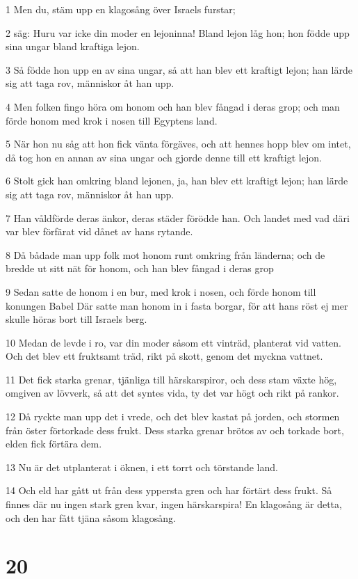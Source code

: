 \par 1 Men du, stäm upp en klagosång över Israels furstar;
\par 2 säg: Huru var icke din moder en lejoninna! Bland lejon låg hon; hon födde upp sina ungar bland kraftiga lejon.
\par 3 Så födde hon upp en av sina ungar, så att han blev ett kraftigt lejon; han lärde sig att taga rov, människor åt han upp.
\par 4 Men folken fingo höra om honom och han blev fångad i deras grop; och man förde honom med krok i nosen till Egyptens land.
\par 5 När hon nu såg att hon fick vänta förgäves, och att hennes hopp blev om intet, då tog hon en annan av sina ungar och gjorde denne till ett kraftigt lejon.
\par 6 Stolt gick han omkring bland lejonen, ja, han blev ett kraftigt lejon; han lärde sig att taga rov, människor åt han upp.
\par 7 Han våldförde deras änkor, deras städer förödde han. Och landet med vad däri var blev förfärat vid dånet av hans rytande.
\par 8 Då bådade man upp folk mot honom runt omkring från länderna; och de bredde ut sitt nät för honom, och han blev fångad i deras grop
\par 9 Sedan satte de honom i en bur, med krok i nosen, och förde honom till konungen Babel Där satte man honom in i fasta borgar, för att hans röst ej mer skulle höras bort till Israels berg.
\par 10 Medan de levde i ro, var din moder såsom ett vinträd, planterat vid vatten. Och det blev ett fruktsamt träd, rikt på skott, genom det myckna vattnet.
\par 11 Det fick starka grenar, tjänliga till härskarspiror, och dess stam växte hög, omgiven av lövverk, så att det syntes vida, ty det var högt och rikt på rankor.
\par 12 Då ryckte man upp det i vrede, och det blev kastat på jorden, och stormen från öster förtorkade dess frukt. Dess starka grenar brötos av och torkade bort, elden fick förtära dem.
\par 13 Nu är det utplanterat i öknen, i ett torrt och törstande land.
\par 14 Och eld har gått ut från dess yppersta gren och har förtärt dess frukt. Så finnes där nu ingen stark gren kvar, ingen härskarspira! En klagosång är detta, och den har fått tjäna såsom klagosång.

\chapter{20}

